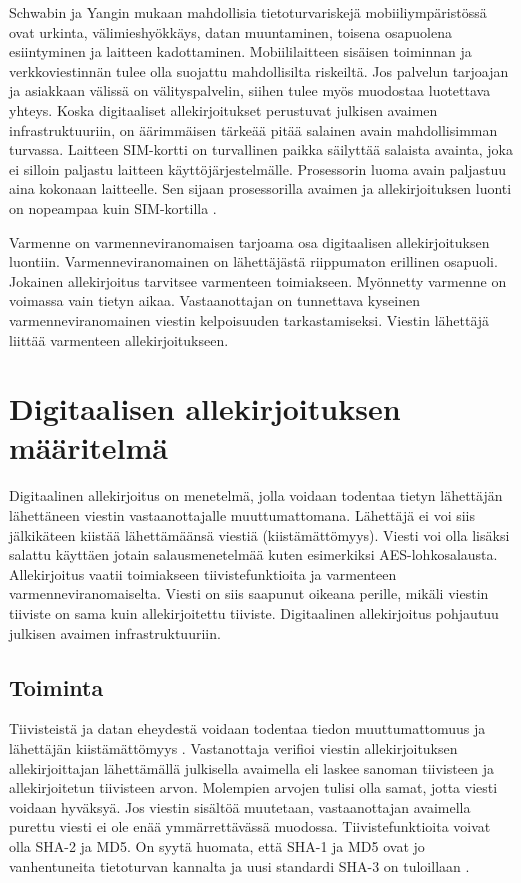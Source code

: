 \documentclass[finnish]{tktltiki2}
\theoremstyle{definition}
\theoremstyle{remark}
\begin{document}
Schwabin ja Yangin mukaan \cite{enti} mahdollisia tietoturvariskejä mobiiliympäristössä ovat urkinta, välimieshyökkäys, datan muuntaminen, toisena osapuolena esiintyminen ja laitteen kadottaminen. Mobiililaitteen sisäisen toiminnan ja verkkoviestinnän tulee olla suojattu mahdollisilta riskeiltä. Jos palvelun tarjoajan ja asiakkaan välissä on välityspalvelin, siihen tulee myös muodostaa luotettava yhteys. Koska digitaaliset allekirjoitukset perustuvat julkisen avaimen infrastruktuuriin, on äärimmäisen tärkeää pitää salainen avain mahdollisimman turvassa. Laitteen SIM-kortti on turvallinen paikka säilyttää salaista avainta, joka ei silloin paljastu laitteen käyttöjärjestelmälle. Prosessorin luoma avain paljastuu aina kokonaan laitteelle. Sen sijaan prosessorilla avaimen ja allekirjoituksen luonti on nopeampaa kuin SIM-kortilla \cite{proxy}. 

Varmenne on varmenneviranomaisen tarjoama osa digitaalisen allekirjoituksen luontiin. Varmenneviranomainen on lähettäjästä riippumaton erillinen osapuoli. Jokainen allekirjoitus tarvitsee varmenteen toimiakseen. Myönnetty varmenne on voimassa vain tietyn aikaa. Vastaanottajan on tunnettava kyseinen varmenneviranomainen viestin kelpoisuuden tarkastamiseksi. Viestin lähettäjä liittää varmenteen allekirjoitukseen. \cite{ECC}       


\section{Digitaalisen allekirjoituksen määritelmä}

Digitaalinen allekirjoitus on menetelmä, jolla voidaan todentaa tietyn lähettäjän lähettäneen viestin vastaanottajalle muuttumattomana. Lähettäjä ei voi siis jälkikäteen kiistää lähettämäänsä viestiä (kiistämättömyys). Viesti voi olla lisäksi salattu käyttäen jotain salausmenetelmää kuten esimerkiksi AES-lohkosalausta. Allekirjoitus vaatii toimiakseen tiivistefunktioita ja varmenteen varmenneviranomaiselta. Viesti on siis saapunut oikeana perille, mikäli viestin tiiviste on sama kuin allekirjoitettu tiiviste. Digitaalinen allekirjoitus pohjautuu julkisen avaimen infrastruktuuriin.

\subsection{Toiminta} 

Tiivisteistä ja datan eheydestä voidaan todentaa tiedon muuttumattomuus ja lähettäjän kiistämättömyys \cite{moen}. Vastanottaja verifioi viestin allekirjoituksen allekirjoittajan lähettämällä julkisella avaimella eli laskee sanoman tiivisteen ja allekirjoitetun tiivisteen arvon. Molempien arvojen tulisi olla samat, jotta viesti voidaan hyväksyä. Jos viestin sisältöä muutetaan, vastaanottajan avaimella purettu viesti ei ole enää ymmärrettävässä muodossa. Tiivistefunktioita voivat olla SHA-2 ja MD5. On syytä huomata, että SHA-1 ja MD5 ovat jo vanhentuneita tietoturvan kannalta ja uusi standardi SHA-3 on tuloillaan \cite{nist}.   
\end{document}

